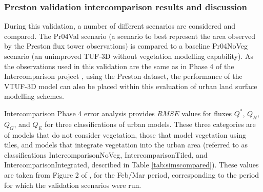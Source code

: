 \documentclass[final,3p,times,authoryear]{elsarticle}
\begin{document}


\subsubsection{Preston validation intercomparison results and discussion}\label{sec:interresults}
During this validation, a number of different scenarios are considered and compared. The Pr04Val scenario (a scenario to best represent the area observed by the Preston flux tower observations) is compared to a baseline Pr04NoVeg scenario (an unimproved TUF-3D without vegetation modelling capability). As the observations used in this validation are the same as in Phase 4 of the Intercomparison project \citep{Best2012}, using the \cite{Coutts2007} Preston dataset, the performance of the VTUF-3D model can also be placed within this evaluation of urban land surface modelling schemes. 

Intercomparison Phase 4 error analysis provides $RMSE$ values for fluxes $Q^{*}$, $Q_{H}$, $Q_{G}$, and $Q_{E}$ for three classifications of urban models. These three categories are of models that do not consider vegetation, those that model vegetation using tiles, and models that integrate vegetation into the urban area (referred to as classifications IntercomparisonNoVeg, IntercomparisonTiled, and IntercomparisonIntegrated, described in Table \ref{tab:simscompared}). These values are taken from Figure 2 of \cite{Best2012}, for the Feb/Mar period, corresponding to the period for which the validation scenarios were run. 


\end{document}
